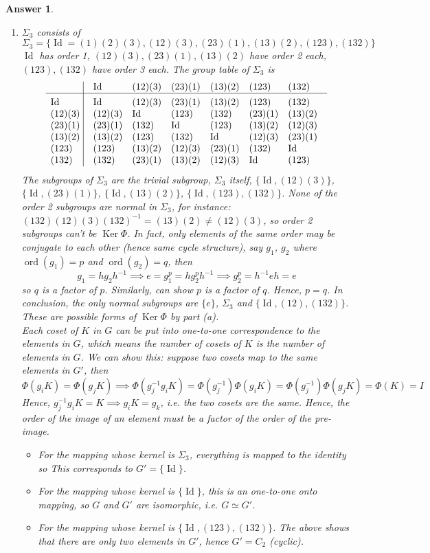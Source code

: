 \documentclass[a4paper]{article}
\DeclareMathOperator{\ord}{ord}
\DeclareMathOperator{\Ker}{Ker}
\DeclareMathOperator{\Id}{Id}
\newtheorem{ans}{Answer}[section]
\theoremstyle{new}
\begin{document}
\begin{ans}
\begin{enumerate}[label=(\alph*)]
\item $\Sigma_3$ consists of
$$\Sigma_3=\{\Id=(1)(2)(3),(12)(3),(23)(1),(13)(2),(123),(132)\}$$
$\Id$ has order 1, $(12)(3),(23)(1),(13)(2)$ have order 2 each, $(123),(132)$ have order 3 each. The group table of $\Sigma_3$ is
$$\vbox{\tabskip0.5em\offinterlineskip
    \halign{\strut$#$\hfil\ \tabskip1em\vrule&&$#$\hfil\cr
    & \Id & (12)(3) & (23)(1) & (13)(2) & (123) & (132)     \cr
    \noalign{\hrule}\vrule height 12pt width 0pt
    \Id  & \Id & (12)(3)   & (23)(1)   & (13)(2) & (123) & (132)     \cr
     (12)(3) & (12)(3) & \Id & (123)   & (132)   & (23)(1) & (13)(2)     \cr
    (23)(1) & (23)(1)   & (132)   & \Id  & (123) & (13)(2) & (12)(3)      \cr
    (13)(2) & (13)(2)  & (123)   & (132) & \Id   & (12)(3) & (23)(1)      \cr
    (123) & (123) & (13)(2) & (12)(3) & (23)(1) & (132) & \Id \cr
    (132) & (132)  & (23)(1)   & (13)(2)   & (12)(3)   & \Id & (123)     \cr
}}$$
The subgroups of $\Sigma_3$ are the trivial subgroup, $\Sigma_3$ itself, $\{\Id,(12)(3)\}$, $\{\Id,(23)(1)\}$, $\{\Id,(13)(2)\}$, $\{\Id,(123),(132)\}$. None of the order 2 subgroups are normal in $\Sigma_3$, for instance: $(132)(12)(3)(132)^{-1}=(13)(2)\neq(12)(3)$, so order 2 subgroups can't be $\Ker\Phi$. In fact, only elements of the same order may be conjugate to each other (hence same cycle structure), say $g_1$, $g_2$ where $\ord(g_1)=p$ and $\ord(g_2)=q$, then
$$g_1=hg_2h^{-1}\implies e=g_1^p=hg_2^ph^{-1}\implies g_2^p=h^{-1}eh=e$$
so $q$ is a factor of $p$. Similarly, can show $p$ is a factor of $q$. Hence, $p=q$. In conclusion, the only normal subgroups are $\{e\}$, $\Sigma_3$ and $\{\Id,(12),(132)\}$. These are possible forms of $\Ker\Phi$ by part (a).\\[5pt]
Each coset of $K$ in $G$ can be put into one-to-one correspondence to the elements in $G$, which means the number of cosets of $K$ is the number of elements in $G$. We can show this: suppose two cosets map to the same elements in $G'$, then
$$\Phi(g_iK)=\Phi(g_jK)\implies \Phi(g_j^{-1}g_iK)=\Phi(g_j^{-1})\Phi(g_iK)=\Phi(g_j^{-1})\Phi(g_jK)=\Phi(K)=I$$
Hence, $g_j^{-1}g_iK=K\implies g_iK=g_k$, i.e. the two cosets are the same. Hence, the order of the image of an element must be a factor of the order of the pre-image.
\begin{itemize}
\item For the mapping whose kernel is $\Sigma_3$, everything is mapped to the identity so This corresponds to $G'=\{\Id\}$.
\item For the mapping whose kernel is $\{\Id\}$, this is an one-to-one onto mapping, so $G$ and $G'$ are isomorphic, i.e. $G\simeq G'$.
\item For the mapping whose kernel is $\{\Id,(123),(132)\}$. The above shows that there are only two elements in $G'$, hence $G'=C_2$ (cyclic).
\end{itemize}
\end{enumerate}
\end{ans}
\end{document}
